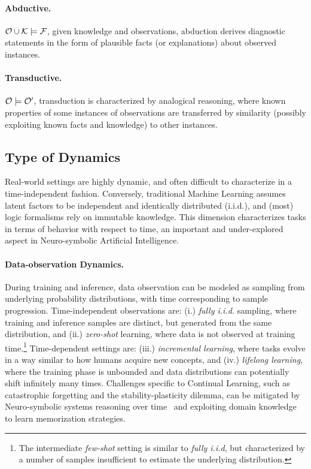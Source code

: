 \paragraph{Abductive.} ${\mathcal{O}} \cup {\mathcal{K}} \models {\mathcal{F}}$, given knowledge and observations, abduction derives diagnostic statements in the form of plausible facts (or explanations) about observed instances.

\paragraph{Transductive.}${\mathcal{O}} \models {\mathcal{O}}'$, transduction is characterized by analogical reasoning, where known properties of some instances of observations are transferred by similarity (possibly exploiting known facts and knowledge) to other instances.

\subsection{Type of Dynamics}
Real-world settings are highly dynamic, and often difficult to characterize in a time-independent fashion. Conversely, traditional Machine Learning assumes latent factors to be independent and identically distributed (i.i.d.), and (most) logic formalisms rely on immutable knowledge.
This dimension characterizes tasks in terms of behavior with respect to time, an important and under-explored aspect in Neuro-symbolic Artificial Intelligence. 

\paragraph{Data-observation Dynamics.} During training and inference, data observation can be modeled as sampling from underlying probability distributions, with time corresponding to sample progression. Time-independent observations are: (i.) \textit{fully i.i.d.} sampling, where training and inference samples are distinct, but generated from the same distribution, and (ii.) \textit{zero-shot} learning, where data is not observed at training time.\footnote{The intermediate \textit{few-shot} setting is similar to \textit{fully i.i.d}, but characterized by a number of samples insufficient to estimate the underlying distribution.}
Time-dependent settings are: (iii.) \textit{incremental learning}, where tasks evolve in a way similar to how humans acquire new concepts, and (iv.) \textit{lifelong learning}, where the training phase is unbounded and data distributions can potentially shift infinitely many times.
Challenges specific to Continual Learning, such as catastrophic forgetting and the stability-plasticity dilemma, can be mitigated by Neuro-symbolic systems reasoning over time~\cite{marconato2023neuro} and exploiting domain knowledge to learn memorization strategies.


